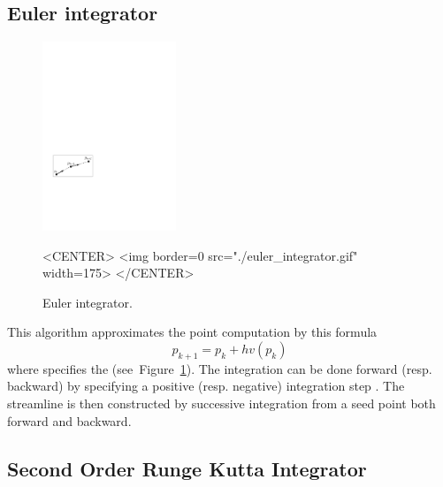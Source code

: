 \subsection{Euler integrator}

\begin{figure}[h!]
\begin{ccTexOnly}
\begin{center}
\includegraphics[width=4cm]{Stream_lines_2/euler_integrator}
\end{center}
\end{ccTexOnly}
\caption{Euler integrator.
\label{euler_fig}}
\begin{ccHtmlOnly}
<CENTER>
<img border=0 src="./euler_integrator.gif" width=175>
</CENTER>
\end{ccHtmlOnly}
\end{figure}

This algorithm approximates the point computation by this formula
$$p_{k+1} = p_k + hv(p_k)$$ where  specifies the
 (see~Figure~\ref{euler_fig}). The integration
can be done forward (resp. backward) by specifying a positive
(resp. negative) integration step . The streamline is then
constructed by successive integration from a seed point both forward
and backward.

\subsection{Second Order Runge Kutta Integrator}

